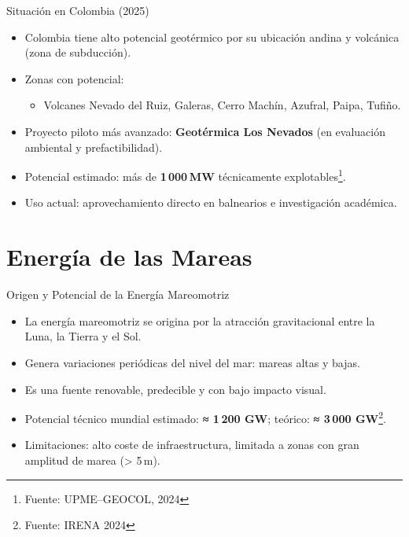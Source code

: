 \documentclass[main.tex]{subfiles}
\begin{document}
\begin{frame}{Situación en Colombia (2025)}
    \begin{itemize}
        \item Colombia tiene alto potencial geotérmico por su ubicación andina y volcánica (zona de subducción).
        \item Zonas con potencial: 
        \begin{itemize}
            \item Volcanes Nevado del Ruiz, Galeras, Cerro Machín, Azufral, Paipa, Tufiño.
        \end{itemize}
        \item Proyecto piloto más avanzado: \textbf{Geotérmica Los Nevados} (en evaluación ambiental y prefactibilidad).
        \item Potencial estimado: más de \textbf{1\,000 MW} técnicamente explotables\footnote{Fuente: UPME–GEOCOL, 2024}.
        \item Uso actual: aprovechamiento directo en balnearios e investigación académica.
    \end{itemize}
\end{frame}


\section{Energía de las Mareas}

\begin{frame}{Origen y Potencial de la Energía Mareomotriz}
    \begin{itemize}
        \item La energía mareomotriz se origina por la atracción gravitacional entre la Luna, la Tierra y el Sol.
        \item Genera variaciones periódicas del nivel del mar: mareas altas y bajas.
        \item Es una fuente renovable, predecible y con bajo impacto visual.
        \item Potencial técnico mundial estimado: \textbf{≈ 1 200 GW}; teórico: \textbf{≈ 3 000 GW}\footnote{Fuente: IRENA 2024}.
        \item Limitaciones: alto coste de infraestructura, limitada a zonas con gran amplitud de marea (\textgreater{} 5 m).
    \end{itemize}
\end{frame}
\end{document}
